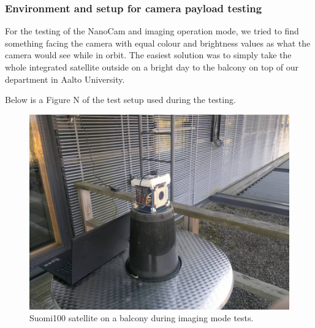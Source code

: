 \documentclass[english,12pt,a4paper,pdftex,elec,utf8]{aaltothesis}
\begin{document}
\subsubsection{Environment and setup for camera payload testing}
For the testing of the NanoCam and imaging operation mode, we tried to find something facing the camera with equal colour and brightness values as what the camera would see while in orbit. The easiest solution was to simply take the whole integrated satellite outside on a bright day to the balcony on top of our department in Aalto University.\par 
Below is a Figure N of the test setup used during the testing.\par 
\begin{figure}[h!]
\includegraphics[scale=0.3]{camerabucketspurgu}
\caption{Suomi100 satellite on a balcony during imaging mode tests.}
\end{figure} 
\end{document}
